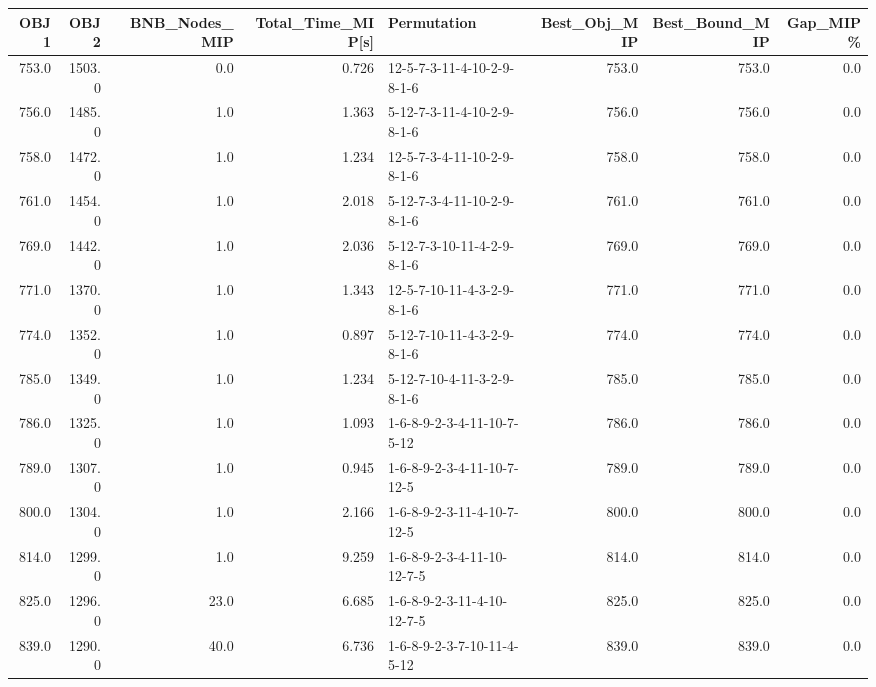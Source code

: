 \begin{tabular}{rrrrlrrr}
\toprule
   OBJ1 &    OBJ2 &  BNB\_Nodes\_MIP &  Total\_Time\_MIP[s] &                 Permutation &  Best\_Obj\_MIP &  Best\_Bound\_MIP &  Gap\_MIP\% \\
\midrule
  753.0 &  1503.0 &            0.0 &              0.726 &  12-5-7-3-11-4-10-2-9-8-1-6 &         753.0 &           753.0 &       0.0 \\
  756.0 &  1485.0 &            1.0 &              1.363 &  5-12-7-3-11-4-10-2-9-8-1-6 &         756.0 &           756.0 &       0.0 \\
  758.0 &  1472.0 &            1.0 &              1.234 &  12-5-7-3-4-11-10-2-9-8-1-6 &         758.0 &           758.0 &       0.0 \\
  761.0 &  1454.0 &            1.0 &              2.018 &  5-12-7-3-4-11-10-2-9-8-1-6 &         761.0 &           761.0 &       0.0 \\
  769.0 &  1442.0 &            1.0 &              2.036 &  5-12-7-3-10-11-4-2-9-8-1-6 &         769.0 &           769.0 &       0.0 \\
  771.0 &  1370.0 &            1.0 &              1.343 &  12-5-7-10-11-4-3-2-9-8-1-6 &         771.0 &           771.0 &       0.0 \\
  774.0 &  1352.0 &            1.0 &              0.897 &  5-12-7-10-11-4-3-2-9-8-1-6 &         774.0 &           774.0 &       0.0 \\
  785.0 &  1349.0 &            1.0 &              1.234 &  5-12-7-10-4-11-3-2-9-8-1-6 &         785.0 &           785.0 &       0.0 \\
  786.0 &  1325.0 &            1.0 &              1.093 &  1-6-8-9-2-3-4-11-10-7-5-12 &         786.0 &           786.0 &       0.0 \\
  789.0 &  1307.0 &            1.0 &              0.945 &  1-6-8-9-2-3-4-11-10-7-12-5 &         789.0 &           789.0 &       0.0 \\
  800.0 &  1304.0 &            1.0 &              2.166 &  1-6-8-9-2-3-11-4-10-7-12-5 &         800.0 &           800.0 &       0.0 \\
  814.0 &  1299.0 &            1.0 &              9.259 &  1-6-8-9-2-3-4-11-10-12-7-5 &         814.0 &           814.0 &       0.0 \\
  825.0 &  1296.0 &           23.0 &              6.685 &  1-6-8-9-2-3-11-4-10-12-7-5 &         825.0 &           825.0 &       0.0 \\
  839.0 &  1290.0 &           40.0 &              6.736 &  1-6-8-9-2-3-7-10-11-4-5-12 &         839.0 &           839.0 &       0.0 \\

\end{tabular}
